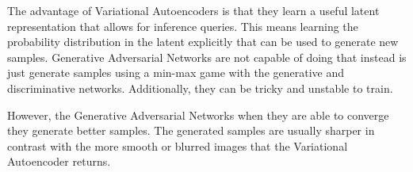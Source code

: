 The advantage of Variational Autoencoders is that they learn a useful latent representation that allows for inference queries. This means learning the probability distribution in the latent explicitly that can be used to generate new samples. Generative Adversarial Networks are not capable of doing that instead is just generate samples using a min-max game with the generative and discriminative networks. Additionally, they can be tricky and unstable to train. 

However, the Generative Adversarial Networks when they are able to converge they generate better samples. The generated samples are usually sharper in contrast with the more smooth or blurred images that the Variational Autoencoder returns.
